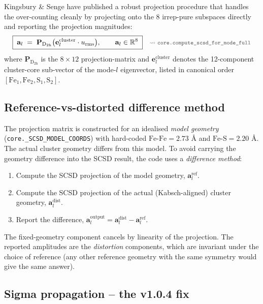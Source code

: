 \documentclass[10pt,a4paper,twoside]{article}
\newcommand{\R}{\mathbb{R}}
\newcommand{\evec}{\mathbf{e}}
\newcommand{\urms}{u_{\mathrm{rms}}}
\newcommand{\codref}[1]{%
  \quad\text{\textcolor{gray!70!black}{\footnotesize $\rightsquigarrow$~\texttt{#1}}}}
\newcommand{\fn}[1]{\texttt{#1}}
\begin{document}
Kingsbury \& Senge \cite{Kingsbury2024} have published a robust
projection procedure that handles the over-counting cleanly by
projecting onto the 8 irrep-pure subspaces directly and reporting
the projection magnitudes:
\begin{equation}
  \boxed{\;\mathbf{a}_l
    \;=\;
  \mathbf{P}_{\mathrm{D}_{2\mathrm{h}}}
   \bigl(\evec_l^\text{cluster} \cdot \urms\bigr),
   \qquad
   \mathbf{a}_l \in \R^8\;}
  \codref{core.compute\_scsd\_for\_mode\_full}
  \label{eq:scsd-projection-derivation}
\end{equation}
where $\mathbf{P}_{\mathrm{D}_{2\mathrm{h}}}$ is the $8 \times 12$
projection-matrix and $\evec_l^\text{cluster}$ denotes the
12-component cluster-core sub-vector of the mode-$l$ eigenvector,
listed in canonical order
$[\text{Fe}_1, \text{Fe}_2, \text{S}_1, \text{S}_2]$.

\subsection{Reference-vs-distorted difference method}

\codref{core.compute\_scsd\_for\_mode\_full}

The projection matrix is constructed for an idealised \emph{model
geometry} (\fn{core.\_SCSD\_MODEL\_COORDS}) with hard-coded
$\text{Fe-Fe} = 2.73$ \AA{} and $\text{Fe-S} = 2.20$ \AA{}. The
actual cluster geometry differs from this model. To avoid carrying
the geometry difference into the SCSD result, the code uses a
\emph{difference method}:
\begin{enumerate}
  \item Compute the SCSD projection of the model geometry,
        $\mathbf{a}_l^\text{ref}$.
  \item Compute the SCSD projection of the actual (Kabsch-aligned)
        cluster geometry, $\mathbf{a}_l^\text{dist}$.
  \item Report the difference,
        $\mathbf{a}_l^\text{output} =
         \mathbf{a}_l^\text{dist} - \mathbf{a}_l^\text{ref}$.
\end{enumerate}
The fixed-geometry component cancels by linearity of the
projection. The reported amplitudes are the \emph{distortion}
components, which are invariant under the choice of reference
(any other reference geometry with the same symmetry would give
the same answer).

\subsection{Sigma propagation -- the v1.0.4 fix}
\end{document}
